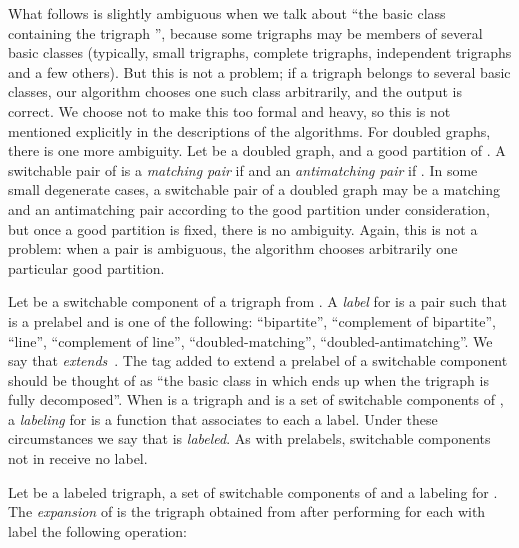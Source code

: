 \documentclass[11 pt] {article}
\begin{document}
What follows is slightly ambiguous when we talk about ``the basic
class containing the trigraph '', because some trigraphs may be
members of several basic classes (typically, small trigraphs, complete
trigraphs, independent trigraphs and a few others).  But this is not a
problem; if a trigraph belongs to several basic classes, our algorithm
chooses one such class arbitrarily, and the output is correct.  We
choose not to make this too formal and heavy, so this is not mentioned
explicitly in the descriptions of the algorithms.  For doubled graphs,
there is one more ambiguity.  Let  be a doubled graph, and 
 a good partition of .  A switchable pair  of  is a
\emph{matching pair} if  and an \emph{antimatching pair}
if .  In some small degenerate cases, a switchable pair of
a doubled graph may be a matching and an antimatching pair according
to the good partition under consideration, but once a good partition
is fixed, there is no ambiguity.  Again, this is not a problem: when a
pair is ambiguous, the algorithm chooses arbitrarily one particular
good partition.  


Let  be a switchable component of a trigraph from .  A
\emph{label} for  is a pair  such that  is a
prelabel and  is one of the following: ``bipartite'', ``complement
of bipartite'', ``line'', ``complement of line'',
``doubled-matching'', ``doubled-antimatching''.  We say that 
\emph{extends}~.  The tag added to extend a prelabel of a
switchable component  should be thought of as ``the basic class in
which  ends up when the trigraph is fully decomposed''.  When 
is a trigraph and  is a set of switchable components of , a
\emph{labeling} for  is a function that associates to
each  a label.  Under these circumstances we say that
 is {\em labeled}.  As with prelabels, switchable components not in
 receive no label. 


Let  be a labeled trigraph,  a set of switchable components
of  and  a labeling for .  The
\emph{expansion} of  is the trigraph obtained
from  after performing for each  with label  the
following operation:
\end{document}

